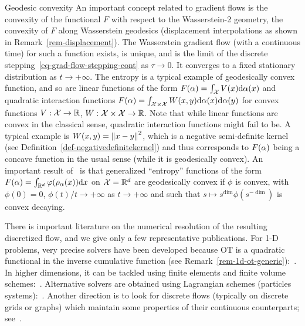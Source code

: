 \begin{rem2}{Geodesic convexity}
An important concept related to gradient flows is the convexity of the functional $F$ with respect to the Wasserstein-2 geometry, \ie the convexity of $F$ along Wasserstein geodesics (\ie displacement interpolations as shown in Remark~\ref{rem-displacement}). The Wasserstein gradient flow (with a continuous time) for such a function exists, is unique, and is the limit of the discrete stepping~\eqref{eq-grad-flow-stepping-cont} as $\tau \rightarrow 0$. It converges to a fixed stationary distribution as $t \rightarrow +\infty$.    
%
The entropy is a typical example of geodesically convex function, and so are linear functions of the form $F(\alpha) = \int_{\mathcal{X}} V(x) \mathrm{d}\alpha(x)$ and quadratic interaction functions $F(\alpha) = \int_{\mathcal{X} \times \mathcal{X}} W(x,y) \mathrm{d}\alpha(x) \mathrm{d}\alpha(y)$ for convex functions $V : \mathcal{X} \rightarrow \mathbb{R}$, $W : \mathcal{X} \times \mathcal{X} \rightarrow \mathbb{R}$. 
%
Note that while linear functions are convex in the classical sense, quadratic interaction functions might fail to be.
%
A typical example is $W(x,y)=\left\| x-y \right\|^2$, which is a negative semi-definite kernel (see Definition~\ref{def-negativedefinitekernel}) and thus corresponds to $F(\alpha)$ being a concave function in the usual sense (while it is geodesically convex).  
%
An important result of~\citet{mccann1997convexity} is that generalized ``entropy'' functions of the form $F(\alpha) = \int_{\mathbb{R}^d} \varphi(\rho_{\alpha}(x)) \mathrm{d} x$ on $\mathcal{X}=\mathbb{R}^d$ are geodesically convex if $\phi$ is convex, with $\phi(0)=0$, $\phi(t)/t \rightarrow +\infty$ as $t \rightarrow +\infty$ and such that  $s \mapsto s^{\dim} \phi(s^{-\dim})$ is convex decaying.
\end{rem2}

There is important literature on the numerical resolution of the resulting discretized flow, and we give only a few representative publications. For 1-D problems, very precise solvers have been developed because OT is a quadratic functional in the inverse cumulative function (see Remark~\ref{rem-1d-ot-generic}):~\citet{kinderlehrer1999approximation,blanchet2008convergence,agueh2013one,Matthes1D,blanchet2012optimal}. In higher dimensions, it can be tackled using finite elements and finite volume schemes:~\citet{CarrilloFiniteVolume,burger2010mixed}. Alternative solvers are obtained using Lagrangian schemes (\ie particles systems):~\citet{carrillo2009numerical,JDB-JKO,Westdickenberg2010}.
%
Another direction is to look for discrete flows (typically on discrete grids or graphs) which maintain some properties of their continuous counterparts; see~\citet{MielkeCVPDE,ErbarDCDS,ChowHuangLiZhou2012,Maas2011}.


